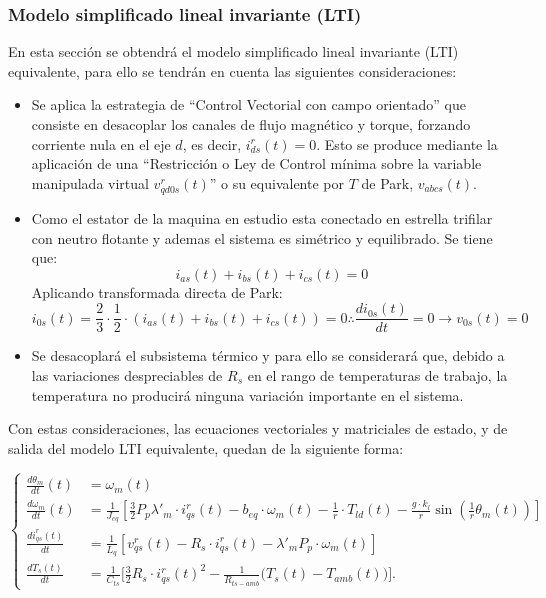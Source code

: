 \documentclass{article}
\begin{document}
\subsubsection{Modelo simplificado lineal invariante (LTI)}
\label{sec:modelo_LTI}
En esta sección se obtendrá el modelo simplificado lineal invariante (LTI) equivalente, para ello se tendrán en cuenta las siguientes consideraciones:
\begin{itemize}
    
    \item Se aplica la estrategia de ``Control Vectorial con campo orientado'' que consiste en desacoplar los canales de flujo magnético y torque, forzando corriente nula en el eje \( d \), es decir, \( i^r_{ds}(t) = 0 \). Esto se produce mediante la aplicación de una ``Restricción o Ley de Control mínima sobre la variable manipulada virtual \( v^r_{qd0s}(t) \)'' o su equivalente por \( T \) de Park, \( v_{abcs}(t) \).

    \item Como el estator de la maquina en
    estudio esta conectado en estrella trifilar con neutro flotante y ademas el sistema es simétrico y equilibrado. Se tiene que: 
    \begin{equation}
    i_{as}(t) + i_{bs}(t) + i_{cs}(t) = 0
    \end{equation}
    Aplicando transformada directa de Park:
    \begin{equation}
    \label{eq:neutro_flotante}
    i_{0s}(t) = \frac{2}{3}\cdot\frac{1}{2}\cdot(i_{as}(t) + i_{bs}(t) + i_{cs}(t)) = 0 \therefore \frac{di_{0s}(t)}{dt} = 0 \rightarrow v_{0s}(t) = 0
    \end{equation}

    \item Se desacoplará el subsistema térmico y para ello se considerará que, debido a las variaciones despreciables de \( R_s \) en el rango de temperaturas de trabajo, la temperatura no producirá ninguna variación importante en el sistema.
\end{itemize}

Con estas consideraciones, las ecuaciones vectoriales y matriciales de estado, y de salida del modelo LTI equivalente, quedan de la siguiente forma:

\begin{equation}
\left\{
\begin{aligned}
\frac{d\theta_m}{dt}(t) &= \omega_m(t) \\[1ex]
\frac{d\omega_m}{dt}(t) &= \frac{1}{J_{eq}}\left[\frac{3}{2}P_p\lambda'_m\cdot i^r_{qs}(t) - b_{eq}\cdot\omega_m(t) - \frac{1}{r}\cdot T_{ld}(t) - \frac{g \cdot k_l}{r}\sin(\frac{1}{r}\theta_m(t))\right] \\[1ex]
\frac{di^r_{qs}(t)}{dt} &= \frac{1}{L_q}\left[v^r_{qs}(t) - R_s\cdot i^r_{qs}(t) - \lambda'_mP_p\cdot\omega_m(t)\right] \\
\frac{d T_s(t)}{dt} &= \frac{1}{C_{ts}} \Bigg[ \frac{3}{2} R_s \cdot i_{qs}^r(t)^2 - \frac{1}{R_{ts-amb}} \big( T_s(t) - T_{amb}(t) \big) \Bigg].
\end{aligned}
\right.
\end{equation}
\end{document}
